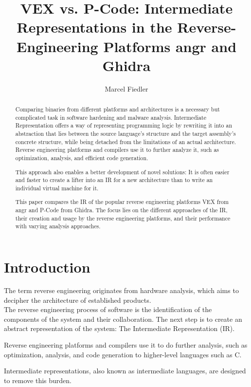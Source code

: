 \documentclass[seminar]{plai}
\title{VEX vs. P-Code: Intermediate Representations in the Reverse-Engineering Platforms angr and Ghidra}
\author{Marcel Fiedler}
\begin{document}
\maketitle

\begin{abstract}

\noindent Comparing binaries from different platforms and architectures is a necessary but complicated task in software hardening and malware analysis.
Intermediate Representation offers a way of representing programming logic by rewriting it into an abstraction that lies between the source language's structure and the target assembly's concrete structure, while being detached from the limitations of an actual architecture.
Reverse engineering platforms and compilers use it to further analyze it, such as optimization, analysis, and efficient code generation.

This approach also enables a better development of novel solutions: It is often easier and faster to create a lifter into an IR for a new architecture than to write an individual virtual machine for it.

\noindent This paper compares the IR of the popular reverse engineering platforms VEX from angr and P-Code from Ghidra.
The focus lies on the different approaches of the IR, their creation and usage by the reverse engineering platforms, and their performance with varying analysis approaches.
\end{abstract}

\section{Introduction}
\label{sec:introduction}

The term reverse engineering originates from hardware analysis, which aims to decipher the architecture of established products.\cite{reverse-engineering-design-recovery-taxonomy}\\
The reverse engineering process of software is the identification of the components of the system and their collaboration. The next step is to create an abstract representation of the system: The Intermediate Representation (IR).

Reverse engineering platforms and compilers use it to do further analysis, such as optimization, analysis, and code generation to higher-level languages such as C.

Intermediate representations, also known as intermediate languages, are designed to remove this burden.
\end{document}
